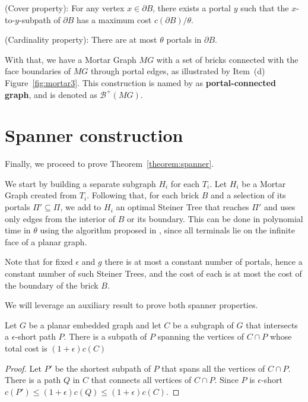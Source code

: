 \begin{flemma} \label{lemma:cobertura}
(Cover property): For any vertex \(x \in \partial B\), there exists a portal \(y\) such that the \(x\)-to-\(y\)-subpath of \(\partial B\) has a maximum cost \(c(\partial B) / \theta\).
\end{flemma}

\begin{flemma}
(Cardinality property): There are at most \(\theta\) portals in \(\partial B\).
\end{flemma}

With that, we have a Mortar Graph \(MG\) with a set of bricks connected with the face boundaries of \(MG\) through portal edges, as illustrated by Item~(d) Figure~\ref{fig:mortar3}. This construction is named by \citeauthor{Borradaile2009b} as \textbf{portal-connected graph}, and is denoted as \(\mathcal{B}^{+}(MG)\).

\section{Spanner construction}

Finally, we proceed to prove Theorem~\ref{theorem:spanner}.

We start by building a separate subgraph \(H_i\) for each \(T_i\). Let \(H_i\) be a Mortar Graph created from \(T_i\). Following that, for each brick \(B\) and a selection of its portals \(\Pi' \subseteq \Pi\), we add to \(H_i\) an optimal Steiner Tree that reaches \(\Pi'\) and uses only edges from the interior of \(B\) or its boundary. This can be done in polynomial time in \(\theta\) using the algorithm proposed in \cite{ericksonST}, since all terminals lie on the infinite face of a planar graph.

Note that for fixed \(\epsilon\) and \(g\) there is at most a constant number of portals, hence a constant number of such Steiner Trees, and the cost of each is at most the cost of the boundary of the brick \(B\).

We will leverage an auxiliary result to prove both spanner properties.

\begin{flemma}\label{lemma:borradaile_10_1}
    Let \(G\) be a planar embedded graph and let \(C\) be a subgraph of \(G\) that intersects a \(\epsilon\)-short path \(P\). There is a subpath of \(P\) spanning the vertices of \(C \cap P\) whose total cost is \((1 + \epsilon) c(C)\)
\end{flemma}
\begin{proof}
    Let \(P'\) be the shortest subpath of \(P\) that spans all the vertices of \(C \cap P\). There is a path \(Q\) in \(C\) that connects all vertices of \(C \cap P\). Since \(P\) is \(\epsilon\)-short \(c(P') \leq (1 + \epsilon)c(Q) \leq (1 + \epsilon)c(C)\).
\end{proof}

